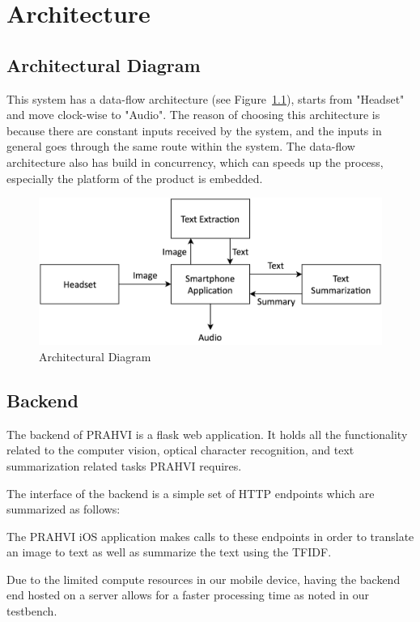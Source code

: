 \chapter{Architecture}
\section{Architectural Diagram}
This system has a data-flow architecture (see Figure~\ref{architectualDiagram}), starts from "Headset" and move clock-wise to "Audio". The reason of choosing this architecture is because there are constant inputs received by the system, and the inputs in general goes through the same route within the system. The data-flow architecture also has build in concurrency, which can speeds up the process, especially the platform of the product is embedded.
\begin{figure}
	\label{architectualDiagram}
	\centering
    \includegraphics[scale = 0.2]{ArchitectureDiagram.png}
    
    \caption{Architectural Diagram}
\end{figure}


\section{Backend}
The backend of PRAHVI is a flask web application. It holds all the functionality related to the computer vision, optical character recognition, and text summarization related tasks PRAHVI requires.

The interface of the backend is a simple set of HTTP endpoints which are summarized as follows:


The PRAHVI iOS application makes calls to these endpoints in order to translate an image to text as well as summarize the text using the TFIDF.

Due to the limited compute resources in our mobile device, having the backend end hosted on a server allows for a faster processing time as noted in our testbench.


